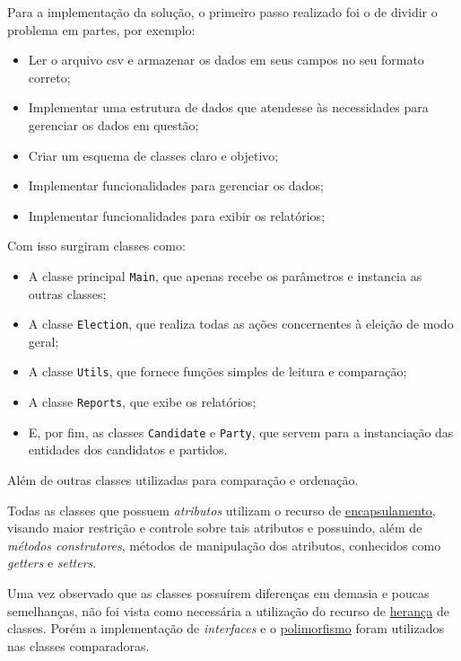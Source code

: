 \documentclass[
		12pt, %
		oneside, %
		a4paper, %
		article, %
		chapter=TITLE, %
		section=TITLE, %
		subsection=TITLE, %
		english, %
		spanish, %
		brazil %
]{abntex2} %
\numberwithin{equation}{section}
\numberwithin{figure}{section}
\numberwithin{table}{section}
\begin{document}
    	Para a implementação da solução, o primeiro passo realizado foi o de dividir o problema em partes, por exemplo:
        \begin{itemize}
            \item Ler o arquivo csv e armazenar os dados em seus campos no seu formato correto;
            \item Implementar uma estrutura de dados que atendesse às necessidades para gerenciar os dados em questão;
            \item Criar um esquema de classes claro e objetivo;
            \item Implementar funcionalidades para gerenciar os dados;
            \item Implementar funcionalidades para exibir os relatórios;
        \end{itemize}
        Com isso surgiram classes como:
        \begin{itemize}
            \item A classe principal \verb|Main|, que apenas recebe os parâmetros e instancia as outras classes;
            \item A classe \verb|Election|, que realiza todas as ações concernentes à eleição de modo geral;
            \item A classe \verb|Utils|, que fornece funções simples de leitura e comparação;
            \item A classe \verb|Reports|, que exibe os relatórios;
            \item E, por fim, as classes \verb|Candidate| e \verb|Party|, que servem para a instanciação das entidades dos candidatos e partidos.
        \end{itemize}
        Além de outras classes utilizadas para comparação e ordenação.

        Todas as classes que possuem \textit{atributos} utilizam o recurso de \underline{encapsulamento}, visando maior restrição e controle sobre tais atributos e possuindo, além de \textit{métodos construtores}, métodos de manipulação dos atributos, conhecidos como \textit{getters} e \textit{setters}.

        Uma vez observado que as classes possuírem diferenças em demasia e poucas semelhanças, não foi vista como necessária a utilização do recurso de \underline{herança} de classes. Porém a implementação de \textit{interfaces} e o \underline{polimorfismo} foram utilizados nas classes comparadoras.

        \newpage
\end{document}
